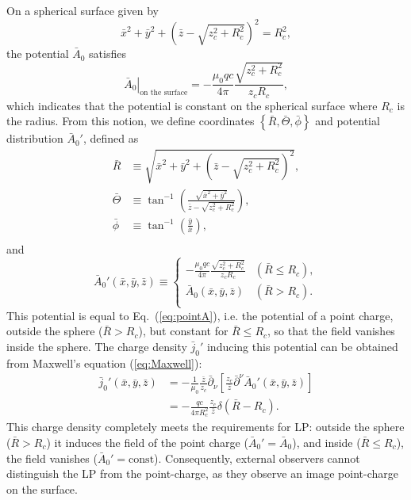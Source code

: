 \documentclass[a4paper,fleqn]{cas-sc}
\begin{document}
On a spherical surface given by
\begin{equation}
\bar{x}^{2} + \bar{y}^{2} + \left(\bar{z} - \sqrt{z_{c}^{2} + R_{c}^{2}}\right)^{2} = R_{c}^{2} ,
\end{equation}
the potential $\bar{A}_{0}$ satisfies
\begin{equation}
\left.\bar{A}_{0}\right|_{\text{on the surface}} = -\displaystyle\frac{\mu_{0}qc}{4\pi} \displaystyle\frac{\sqrt{z_{c}^{2} + R_{c}^{2}}}{z_{c}R_{c}} ,
\end{equation}
which indicates that the potential is constant on the spherical surface where $R_{c}$ is the radius. From this notion, we define coordinates $\left\{\bar{R},\bar{\Theta},\bar{\phi}\right\}$ and potential distribution $\bar{A}_{0}'$, defined as
\begin{equation}
\begin{aligned}
 \bar{R} &\equiv \sqrt{\bar{x}^{2} + \bar{y}^{2} + \left(\bar{z} - \sqrt{z_{c}^{2} + R_{c}^{2}}\right)^{2}} , \\
 \bar{\Theta} &\equiv \tan^{-1}\left(\displaystyle\frac{\sqrt{\bar{x}^{2}+\bar{y}^{2}}}{\bar{z}-\sqrt{z_{c}^{2} + R_{c}^{2}}}\right) , \\
 \bar{\phi} &\equiv \tan^{-1}\left(\displaystyle\frac{\bar{y}}{\bar{x}}\right) , \\
\end{aligned}
\end{equation}
and
\begin{equation}
\bar{A}_{0}'\left(\bar{x},\bar{y},\bar{z}\right) \equiv \begin{cases}
-\displaystyle\frac{\mu_{0}qc}{4\pi} \displaystyle\frac{\sqrt{z_{c}^{2} + R_{c}^{2}}}{z_{c}R_{c}} & \left(\bar{R} \leq R_{c}\right) , \\
\bar{A}_{0}\left(\bar{x},\bar{y},\bar{z}\right) & \left(\bar{R} > R_{c}\right) . \\
\end{cases}
\end{equation}
This potential is equal to Eq.~(\ref{eq:pointA}), i.e. the potential of a point charge, outside the sphere ($\bar{R}>R_{c}$), but constant for $\bar{R} \leq R_{c}$, so that the field vanishes inside the sphere. The charge density $\bar{j}_{0}'$ inducing this potential can be obtained from Maxwell's equation (\ref{eq:Maxwell}):
\begin{align}
\bar{j}_{0}'\left(\bar{x},\bar{y},\bar{z}\right) &= -\displaystyle\frac{1}{\mu_{0}} \displaystyle\frac{\bar{z}}{z_{c}} \bar{\partial}_{\nu} \left[\displaystyle\frac{z_{c}}{\bar{z}} \bar{\partial}^{\nu} \bar{A}_{0}'\left(\bar{x},\bar{y},\bar{z}\right)\right] \nonumber \\
&= -\displaystyle\frac{qc}{4\pi R_{c}^{2}} \displaystyle\frac{z_{c}}{\bar{z}} \delta\left(\bar{R}-R_{c}\right). \label{eq:density}
\end{align}
This charge density completely meets the requirements for LP: outside the sphere ($\bar{R}>R_{c}$) it induces the field of the point charge ($\bar{A}_{0}' = \bar{A}_{0}$), and inside ($\bar{R} \leq R_{c}$), the field vanishes ($\bar{A}_{0}' = \mathrm{const}$). Consequently, external observers cannot distinguish the LP from the point-charge, as they observe an image point-charge on the surface.
\end{document}
